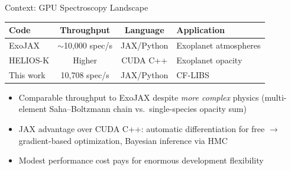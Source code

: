 \documentclass[aspectratio=169,10pt]{beamer}
\begin{document}
\begin{frame}{Context: GPU Spectroscopy Landscape}
	\centering
	{\small
	\begin{tabular}{lccl}
		\toprule
		\textbf{Code} & \textbf{Throughput} & \textbf{Language} & \textbf{Application} \\
		\midrule
		ExoJAX       & $\sim$10,000 spec/s & JAX/Python    & Exoplanet atmospheres \\
		HELIOS-K     & Higher              & CUDA C++      & Exoplanet opacity \\
		\alert{This work} & \alert{10,708 spec/s}  & \alert{JAX/Python} & \alert{CF-LIBS} \\
		\bottomrule
	\end{tabular}}

	\vspace{0.5em}
	\begin{itemize}
		\item {\small Comparable throughput to ExoJAX despite \emph{more complex} physics
		      (multi-element Saha--Boltzmann chain vs.\ single-species opacity sum)}
		\item {\small JAX advantage over CUDA C++: automatic differentiation for free
		      $\to$ gradient-based optimization, Bayesian inference via HMC}
		\item {\small Modest performance cost pays for enormous development flexibility}
	\end{itemize}
\end{frame}
\end{document}
